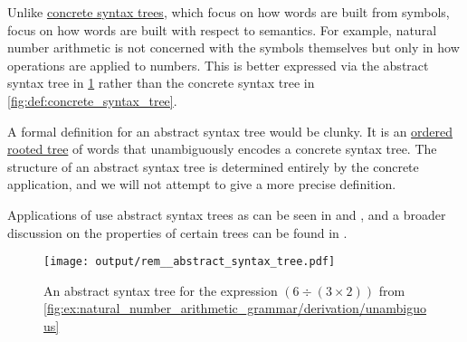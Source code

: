 \begin{remark}\label{rem:abstract_syntax_tree}
  Unlike \hyperref[def:concrete_syntax_tree]{concrete syntax trees}, which focus on how words are built from symbols,  focus on how words are built with respect to semantics. For example, natural number arithmetic is not concerned with the symbols themselves but only in how operations are applied to numbers. This is better expressed via the abstract syntax tree in \cref{fig:rem:abstract_syntax_tree} rather than the concrete syntax tree in \cref{fig:def:concrete_syntax_tree}.

  A formal definition for an abstract syntax tree would be clunky. It is an \hyperref[def:ordered_arborescence]{ordered} \hyperref[def:arborescence/undirected]{rooted tree} of words that unambiguously encodes a concrete syntax tree. The structure of an abstract syntax tree is determined entirely by the concrete application, and we will not attempt to give a more precise definition.

  Applications of  use abstract syntax trees as can be seen in  and , and a broader discussion on the properties of certain trees can be found in .

  \begin{figure}[!ht]
    \hfill
    \texttt{[image: output/rem\_\_abstract\_syntax\_tree.pdf]}
    \hfill\hfill
    \caption{An abstract syntax tree for the expression \( (6 \div (3 \times 2)) \) from \cref{fig:ex:natural_number_arithmetic_grammar/derivation/unambiguous}}
    \label{fig:rem:abstract_syntax_tree}
  \end{figure}
\end{remark}


